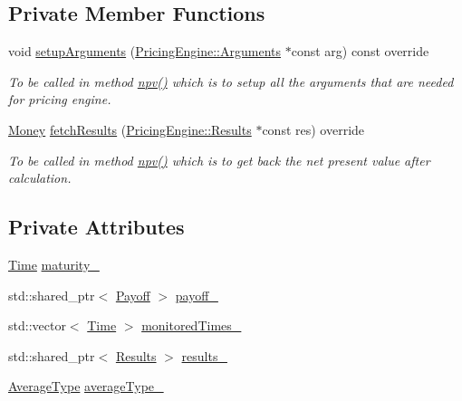 \subsection*{Private Member Functions}
\begin{DoxyCompactItemize}
\item 
void \hyperlink{class_asian_option_a82c9b5fb3bea69f476a65e9675e1cc28}{setup\+Arguments} (\hyperlink{class_pricing_engine_1_1_arguments}{Pricing\+Engine\+::\+Arguments} $\ast$const arg) const override
\begin{DoxyCompactList}\small\item\em To be called in method \hyperlink{class_instrument_aa750f2ae95a21d65a073da3171e8d084}{npv()} which is to setup all the arguments that are needed for pricing engine. \end{DoxyCompactList}\item 
\hyperlink{_name_def_8h_a5a9d48c16a694e9a2d9f1eca730dc8c5}{Money} \hyperlink{class_asian_option_a99cd9956b73d99a64748c913dcccd6ea}{fetch\+Results} (\hyperlink{class_pricing_engine_1_1_results}{Pricing\+Engine\+::\+Results} $\ast$const res) override
\begin{DoxyCompactList}\small\item\em To be called in method \hyperlink{class_instrument_aa750f2ae95a21d65a073da3171e8d084}{npv()} which is to get back the net present value after calculation. \end{DoxyCompactList}\end{DoxyCompactItemize}
\subsection*{Private Attributes}
\begin{DoxyCompactItemize}
\item 
\hyperlink{_name_def_8h_ac2d3e0ba793497bcca555c7c2cf64ff3}{Time} \hyperlink{class_asian_option_aff2f0be31b55a1b859cde9ee9b339075}{maturity\+\_\+}
\item 
std\+::shared\+\_\+ptr$<$ \hyperlink{class_payoff}{Payoff} $>$ \hyperlink{class_asian_option_abb0ef9b7f812435dcf24e4dd8edb2be2}{payoff\+\_\+}
\item 
std\+::vector$<$ \hyperlink{_name_def_8h_ac2d3e0ba793497bcca555c7c2cf64ff3}{Time} $>$ \hyperlink{class_asian_option_a8cc25f4cabd8ceac95a69598481f18c8}{monitored\+Times\+\_\+}
\item 
std\+::shared\+\_\+ptr$<$ \hyperlink{class_asian_option_1_1_results}{Results} $>$ \hyperlink{class_asian_option_aea29a8aff78cbe4101b4f060cedb6307}{results\+\_\+}
\item 
\hyperlink{class_asian_option_add7292791bf85820ff9fdbfd4407f3b9}{Average\+Type} \hyperlink{class_asian_option_a602d4f41bc033a8242a0641cf5104045}{average\+Type\+\_\+}
\end{DoxyCompactItemize}
